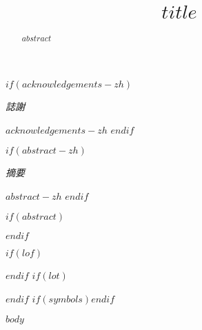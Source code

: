 \documentclass[a4paper, 11pt, oneside]{Thesis}
\title{$title$}
\begin{document}
\frontmatter
\maketitle

$if(acknowledgements-zh)$
\thispagestyle{empty}
\vfil\null
\begin{center}
  {\huge{\textit{誌謝}} \par}
  \bigskip
\end{center}
{\normalsize $acknowledgements-zh$}
\vfil\vfil\vfil\null
\cleardoublepage
$endif$

$if(abstract-zh)$
\thispagestyle{empty}
\vfil\null
\begin{center}
  {\huge{\textit{摘要}} \par}
  \bigskip
\end{center}
{\normalsize $abstract-zh$}
\vfil\vfil\vfil\null
\cleardoublepage
$endif$

$if(abstract)$
\begin{abstract}
$abstract$
\end{abstract}
$endif$

\tableofcontents
$if(lof)$\listoffigures$endif$
$if(lot)$\listoftables$endif$
$if(symbols)$$endif$

\mainmatter
$body$



\backmatter
\end{document}
